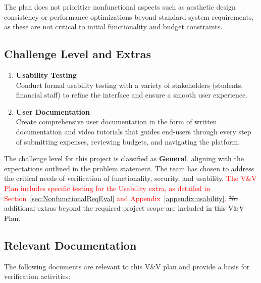 \documentclass[12pt, titlepage]{article}
\begin{document}
The plan does not prioritize nonfunctional aspects such as aesthetic design consistency or performance optimizations beyond standard system requirements, as these are not critical to initial functionality and budget constraints.

\subsection{Challenge Level and Extras}

\begin{enumerate}
  \item \textbf{Usability Testing} \\
  Conduct formal usability testing with a variety of stakeholders (students, financial staff) to refine the interface and ensure a smooth user experience.
  \item \textbf{User Documentation} \\
  Create comprehensive user documentation in the form of written documentation and video tutorials that guides end-users through every step of submitting expenses, reviewing budgets, and navigating the platform.
\end{enumerate}

The challenge level for this project is classified as \textbf{General}, aligning with the expectations outlined in the problem statement. The team has chosen to address the critical needs of verification of functionality, security, and usability. \textcolor{red}{The V\&V Plan includes specific testing for the Usability extra, as detailed in Section~\ref{sec:NonfunctionalReqEval} and Appendix~\ref{appendix:usability}.} \sout{No additional extras beyond the required project scope are included in this V\&V Plan.}

\subsection{Relevant Documentation}

The following documents are relevant to this V\&V plan and provide a basis for verification activities:
\end{document}
